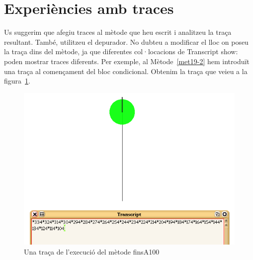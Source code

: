 \section{Experiències amb traces}
Us suggerim que afegiu traces al mètode que heu escrit i analitzeu la traça resultant. També, utilitzeu el depurador. No dubteu a modificar el lloc on poseu la traça dins del mètode, ja que diferentes col·locacions de \textsf{Transcript show:} poden mostrar traces diferents. Per exemple, al Mètode~\ref{met19-2} hem introduït una traça al començament del bloc condicional. Obtenim la traça que veieu a la figura~\ref{fig1904}.
\begin{figure}[h!]
\begin{center}
\includegraphics[scale=0.5]{Imatges/figura19-4.png}
\end{center}
\caption{Una traça de l'execució del mètode \textsf{\upshape finsA100}}
\label{fig1904}
\end{figure}

